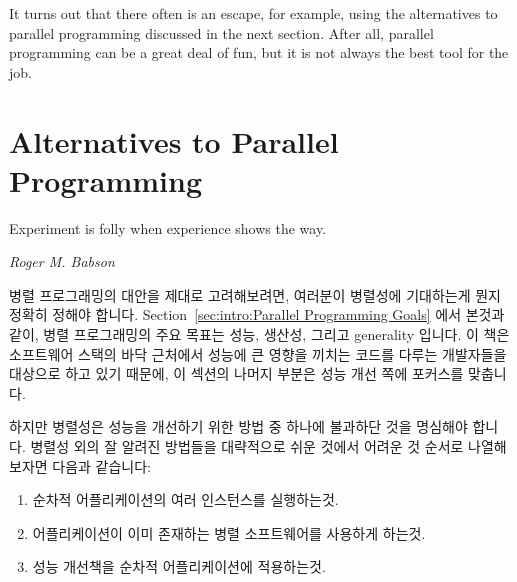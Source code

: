 It turns out that there often is an escape, for example,
using the alternatives to parallel programming discussed in the next section.
After all, parallel programming can be a great deal of fun, but
it is not always the best tool for the job.
\fi

\section{Alternatives to Parallel Programming}
\label{sec:intro:Alternatives to Parallel Programming}
%
\epigraph{Experiment is folly when experience shows the way.}
	 {\emph{Roger M. Babson}}

병렬 프로그래밍의 대안을 제대로 고려해보려면, 여러분이 병렬성에 기대하는게
뭔지 정확히 정해야 합니다.
Section~\ref{sec:intro:Parallel Programming Goals} 에서 본것과 같이, 병렬
프로그래밍의 주요 목표는 성능, 생산성, 그리고 generality 입니다.
이 책은 소프트웨어 스택의 바닥 근처에서 성능에 큰 영향을 끼치는 코드를 다루는
개발자들을 대상으로 하고 있기 때문에, 이 섹션의 나머지 부분은 성능 개선 쪽에
포커스를 맞춥니다.

하지만 병렬성은 성능을 개선하기 위한 방법 중 하나에 불과하단 것을 명심해야
합니다.
병렬성 외의 잘 알려진 방법들을 대략적으로 쉬운 것에서 어려운 것 순서로 나열해
보자면 다음과 같습니다:

\begin{enumerate}
\item	순차적 어플리케이션의 여러 인스턴스를 실행하는것.
\item	어플리케이션이 이미 존재하는 병렬 소프트웨어를 사용하게 하는것.
\item	성능 개선책을 순차적 어플리케이션에 적용하는것.

\end{enumerate}

